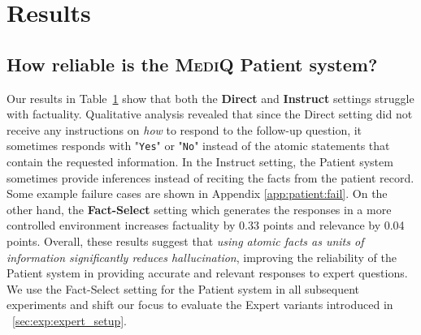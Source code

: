 \documentclass{article}
\newcommand{\Sref}[1]{\textsection~\ref{#1}}
\newcommand{\Tref}[1]{Table~\ref{#1}}
\begin{document}
\section{Results}


\subsection{How reliable is the \textsc{MediQ} Patient system?}
\label{sec:framework:patient_results}

\begin{figure}\vspace{-3.8mm}
\setlength{\tabcolsep}{2pt}
    \centering
    \vspace{-2.2mm}
    \label{tab:patient}\vspace{-3mm}
\end{figure}


Our results in \Tref{tab:patient} show that both the \textbf{Direct} and \textbf{Instruct} settings struggle with factuality.
Qualitative analysis revealed that since the Direct setting did not receive any instructions on \emph{how} to respond to the follow-up question, it sometimes responds with "\texttt{Yes}" or "\texttt{No}" instead of the atomic statements that contain the requested information. In the Instruct setting, the Patient system sometimes provide inferences instead of reciting the facts from the patient record. Some example failure cases are shown in Appendix \ref{app:patient:fail}.
On the other hand, the \textbf{Fact-Select} setting which generates the responses in a more controlled environment  increases factuality by 0.33 points and relevance by 0.04 points. 
Overall, these results suggest that \emph{using atomic facts as units of information significantly reduces hallucination}, improving the reliability of the Patient system in providing accurate and relevant responses to expert questions. We use the Fact-Select setting for the Patient system in all subsequent experiments and shift our focus to evaluate the Expert variants introduced in \Sref{sec:exp:expert_setup}. 
\end{document}
